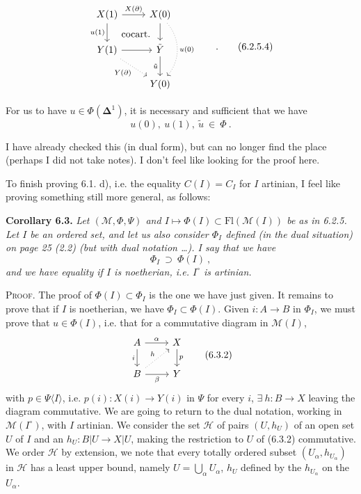 \documentclass[11pt]{article}
\newcommand{\printedpage}[1]{\marginpar{\footnotesize p.~#1}}
\newcommand{\msp}[1]{\marginpar{\footnotesize [#1]}}
\begin{document}
\noindent\printedpage{54}\msp{page 108}
\[
\begin{tikzcd}
X(1) \arrow[r, "X(\partial)"] \arrow[d, "u(1)"'] \arrow[dr, phantom, "\text{cocart.}"] & X(0) \arrow[d] \arrow[dd, dotted, bend left=40, "u(0)"] \\
Y(1) \arrow[r] \arrow[dr, dotted, "Y(\partial)"'] & \tilde{Y} \arrow[d, "\tilde{u}"'] \\
 & Y(0)
\end{tikzcd}
\qquad .
\tag*{(6.2.5.4)}
\]

For us to have $u \in \Phi(\boldsymbol{\Delta}^1)$, it is necessary and sufficient that we have
\[
u(0),\ u(1),\ \tilde{u} \ \in\ \Phi\ .
\tag*{(6.2.5.5)}
\]

I have already checked this (in dual form), but can no longer find the place (perhaps I did not take notes). I don't feel like looking for the proof here.

To finish proving 6.1. d), i.e. the equality $C(I) = C_I$ for $I$ artinian, I feel like proving something still more general, as follows: %

\textbf{Corollary 6.3.} \textit{Let $(\mathcal{M}, \Phi, \Psi)$ and $I \longmapsto \Phi(I) \subset \mathrm{Fl}(\mathcal{M}(I))$ be as in \textup{6.2.5.} Let $I$ be an ordered set, and let us also consider $\Phi_I$ defined (in the dual situation) on page \textup{25 (2.2)} (but with dual notation \dots). I say that we have}
\[
\Phi_I \ \supset\ \Phi(I)\ ,
\tag*{(6.3.1)}
\]
\msp{page 109}\textit{and we have equality if $I$ is noetherian, i.e. $I^{\circ}$ is artinian.}

\textsc{Proof}. The proof of $\Phi(I) \subset \Phi_I$ is the one we have just given. It remains to prove that if $I$ is noetherian, we have $\Phi_I \subset \Phi(I)$. Given $i : A \longrightarrow B$ in $\Phi_I$, we must prove that $u \in \Phi(I)$, %
i.e. that for a commutative diagram in $\mathcal{M}(I)$,
\[
\begin{tikzcd}
A \arrow[r, "\alpha"] \arrow[d, "i"'] & X \arrow[d, "p"] \\
B \arrow[r, "\beta"'] \arrow[ur, dotted, "h"] & Y
\end{tikzcd}
\tag*{(6.3.2)}
\]
with $p \in \Psi\langle I\rangle$, i.e. $p(i) : X(i) \longrightarrow Y(i)$ in $\Psi$ for every $i$, $\exists\ h : B \longrightarrow X$ leaving the diagram commutative. We are going to return to the dual notation, working in $\mathcal{M}(I^{\circ})$, with $I$ artinian. We consider the set $\mathcal{H}$ of pairs %
$(U, h_U)$ of an open set $U$ of $I$ and an $h_U : B|U \longrightarrow X|U$, making the restriction to $U$ of (6.3.2) commutative. %
We order $\mathcal{H}$ by extension, we note that every totally ordered subset $(U_\alpha, h_{U_\alpha})$ in $\mathcal{H}$ has a least upper bound, namely $U = \bigcup_\alpha U_\alpha$, $h_U$ defined by the $h_{U_\alpha}$ on the $U_\alpha$.
\end{document}
